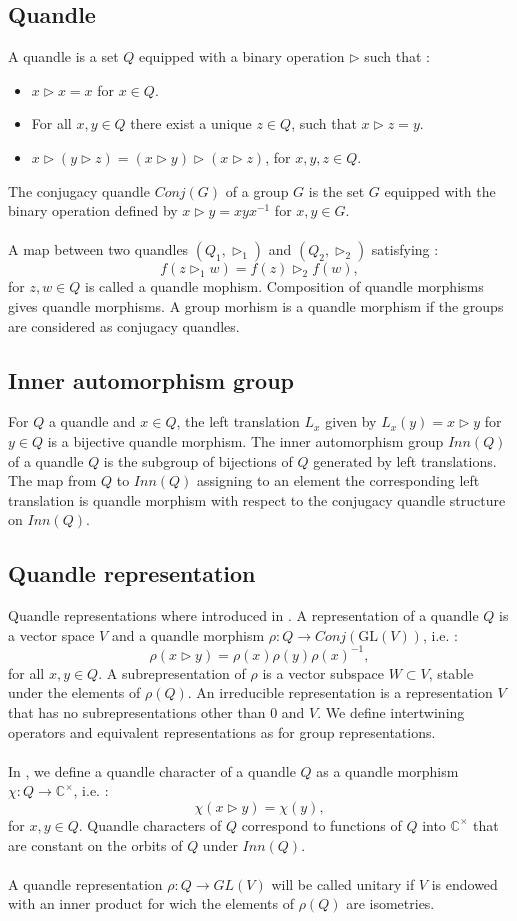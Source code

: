 \documentclass[12pt, reqno]{amsart}
\begin{document}
\subsection{Quandle}
A quandle is a set $Q$ equipped with a binary operation $\triangleright$  such that :
\begin{itemize}
\item[-] $x\triangleright x=x$ for $x\in Q$.
\item[-] For all $x,y \in Q$ there exist a unique $z\in Q$, such that $x \triangleright z=y$.
\item[-] $x \triangleright( y\triangleright z)= (x \triangleright y) \triangleright (x \triangleright z)$, for $x,y,z \in Q$. 
\end{itemize}
The conjugacy quandle $Conj(G)$ of a group $G$ is the set $G$ equipped with the binary operation defined by $x\triangleright y= xyx^{-1}$  for $x,y\in G$.\\\\  
A map between two quandles $(Q_1,\triangleright_1)$ and $(Q_2 ,\triangleright_2)$ satisfying : $$f(z \triangleright_1 w)=f(z) \triangleright_2 f(w),$$
for $z,w \in Q$ is called a quandle mophism. Composition of quandle morphisms gives quandle morphisms. A group morhism is a quandle morphism if the groups are considered as conjugacy quandles.
\subsection{Inner automorphism group}
 For $Q$ a quandle and $x\in Q$, the left translation $L_x$ given by $L_x(y)=x\triangleright y$ for $y\in Q$ is a bijective quandle morphism. The inner automorphism group $Inn(Q)$ of a quandle $Q$ is the subgroup of bijections of $Q$ generated by left translations. The map from $Q$ to $Inn(Q)$ assigning to an element the corresponding left translation is quandle morphism with respect to the conjugacy quandle structure on $Inn(Q)$.
\subsection{Quandle representation}
Quandle representations where introduced in \cite{rep}. A representation of a quandle $Q$ is a vector space $V$ and a quandle morphism $\rho: Q \to Conj(\mathrm{GL}(V))$, i.e. : 
$$\rho(x\triangleright y)=\rho(x) \rho(y) \rho(x)^{-1},$$
for all $x,y \in Q$.
A subrepresentation of $\rho$ is a vector subspace $W\subset V$, stable under the elements of $\rho(Q)$.  An irreducible representation is a representation $V$ that has no subrepresentations other than $0$ and $V$. We define intertwining operators and equivalent representations as for group representations.\\\\
In \cite{Qrep}, we define a quandle character of a quandle $Q$ as a quandle morphism $\chi : Q \to \mathbb{C}^\times$, i.e. :$$\chi(x\triangleright y) =\chi(y),$$ for $x,y\in Q$. Quandle characters of $Q$ correspond to functions of $Q$ into $\mathbb{C}^\times$ that are constant on the orbits of $Q$ under $Inn(Q)$.\\\\
A quandle representation $\rho : Q \to GL(V)$ will be called unitary if $V$ is endowed with an inner product for wich the elements of $\rho(Q)$ are isometries.
\end{document}
